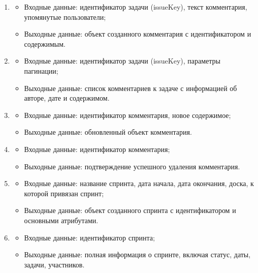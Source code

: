 \documentclass[utf8, russian]{eskdtext}
\begin{document}
\begin{enumerate}
    \item {}
    \begin{itemize}
        \item Входные данные: идентификатор задачи (issueKey), текст комментария, упомянутые пользователи;
        \item Выходные данные: объект созданного комментария с идентификатором и содержимым.
    \end{itemize}
    
    \item {}
    \begin{itemize}
        \item Входные данные: идентификатор задачи (issueKey), параметры пагинации;
        \item Выходные данные: список комментариев к задаче с информацией об авторе, дате и содержимом.
    \end{itemize}
    
    \item {}
    \begin{itemize}
        \item Входные данные: идентификатор комментария, новое содержимое;
        \item Выходные данные: обновленный объект комментария.
    \end{itemize}
    
    \item {}
    \begin{itemize}
        \item Входные данные: идентификатор комментария;
        \item Выходные данные: подтверждение успешного удаления комментария.
    \end{itemize}
    
    \item {}
    \begin{itemize}
        \item Входные данные: название спринта, дата начала, дата окончания, доска, к которой привязан спринт;
        \item Выходные данные: объект созданного спринта с идентификатором и основными атрибутами.
    \end{itemize}
    
    \item {}
    \begin{itemize}
        \item Входные данные: идентификатор спринта;
        \item Выходные данные: полная информация о спринте, включая статус, даты, задачи, участников.
    \end{itemize}
    

\end{enumerate}
\end{document}
